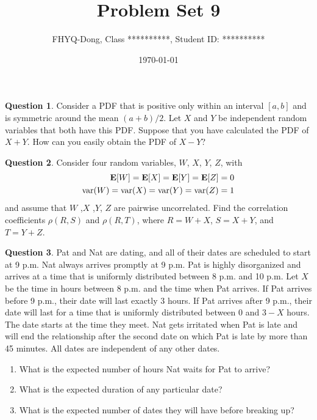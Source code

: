 \documentclass[utf8]{article}
\title{Problem Set 9}
\author{ FHYQ-Dong, Class **********, Student ID: ********** }
\date{\today}
\theoremstyle{definition}%
\newtheorem{question}{Question} %
\theoremstyle{plain}%
\begin{document}
\maketitle
\thispagestyle{fancy}

\begin{question}
    Consider a PDF that is positive only within an interval $[a, b]$ and is symmetric around the mean $(a + b)/2$. Let $X$ and $Y$ be independent random variables that both have this PDF. Suppose that you have calculated the PDF of $X + Y$. How can you easily obtain the PDF of $X - Y$?
\end{question}

\begin{question}
    Consider four random variables, $W$, $X$, $Y$, $Z$, with
    \begin{equation}
    \begin{aligned}
        \mathbf{E}[W] = \mathbf{E}[X] = \mathbf{E}[Y] = \mathbf{E}[Z] = 0 \\
        \mathrm{var}(W) = \mathrm{var}(X) = \mathrm{var}(Y) = \mathrm{var}(Z) = 1 
    \end{aligned}
    \end{equation}
    and assume that $W$ ,$X$ ,$Y$, $Z$ are pairwise uncorrelated. Find the correlation coefficients $\rho(R, S)$ and $\rho(R, T)$, where $R = W + X$, $S = X + Y$, and $T = Y + Z$.
\end{question}

\begin{question}
    Pat and Nat are dating, and all of their dates are scheduled to start at 9 p.m. Nat always arrives promptly at 9 p.m. Pat is highly disorganized and arrives at a time that is uniformly distributed between 8 p.m. and 10 p.m. Let $X$ be the time in hours between 8 p.m. and the time when Pat arrives. If Pat arrives before 9 p.m., their date will last exactly 3 hours. If Pat arrives after 9 p.m., their date will last for a time that is uniformly distributed between 0 and $3 - X$ hours. The date starts at the time they meet. Nat gets irritated when Pat is late and will end the relationship after the second date on which Pat is late by more than 45 minutes. All dates are independent of any other dates.
    \begin{enumerate}[label=(\alph*)]
        \item What is the expected number of hours Nat waits for Pat to arrive? 
        \item What is the expected duration of any particular date?
        \item What is the expected number of dates they will have before breaking up?
    \end{enumerate}
\end{question}
\end{document}
